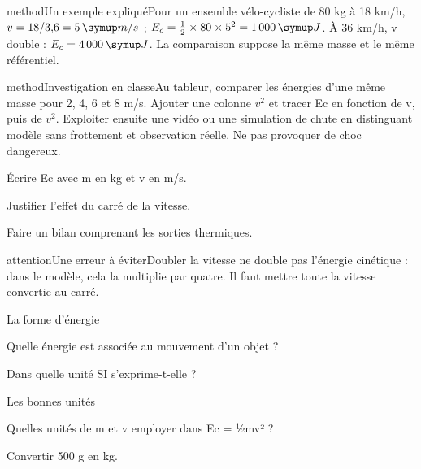 \begin{pcEncadre}{method}{Un exemple expliqué}Pour un ensemble vélo-cycliste de 80 kg à 18 km/h, $v=18/3{,}6=5\unite{m/s}$ ; $E_c=\tfrac12\times80\times5^2=1\,000\unite J$. À 36 km/h, v double : $E_c=4\,000\unite J$. La comparaison suppose la même masse et le même référentiel.\end{pcEncadre}
\label{activite-11}
\begin{pcEncadre}{method}{Investigation en classe}Au tableur, comparer les énergies d’une même masse pour 2, 4, 6 et 8 m/s. Ajouter une colonne $v^2$ et tracer Ec en fonction de v, puis de $v^2$. Exploiter ensuite une vidéo ou une simulation de chute en distinguant modèle sans frottement et observation réelle. Ne pas provoquer de choc dangereux.\end{pcEncadre}
\begin{questions}
\item Écrire Ec avec m en kg et v en m/s.
\item Justifier l’effet du carré de la vitesse.
\item Faire un bilan comprenant les sorties thermiques.
\end{questions}
\begin{pcEncadre}{attention}{Une erreur à éviter}Doubler la vitesse ne double pas l’énergie cinétique : dans le modèle, cela la multiplie par quatre. Il faut mettre toute la vitesse convertie au carré.\end{pcEncadre}
\pcGrille
\clearpage{}
\par\noindent\begin{minipage}{\linewidth}
\begin{exercice}[1]{La forme d’énergie}
\begin{questions}
\item Quelle énergie est associée au mouvement d’un objet ?
\item Dans quelle unité SI s’exprime-t-elle ?
\end{questions}
\end{exercice}
\end{minipage}
\par\noindent\begin{minipage}{\linewidth}
\begin{exercice}[1]{Les bonnes unités}
\begin{questions}
\item Quelles unités de m et v employer dans Ec = ½mv² ?
\item Convertir 500 g en kg.
\end{questions}
\end{exercice}
\end{minipage}
